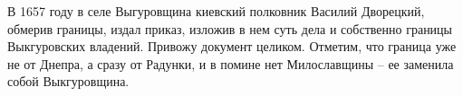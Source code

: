 
В 1657 году в селе Выгуровщина киевский полковник Василий Дворецкий, обмерив границы, издал приказ, изложив в нем суть дела и собственно границы Выкгуровских владений. Привожу документ целиком\cite{mihdocs}. Отметим, что граница уже не от Днепра, а сразу от Радунки, и в помине нет Милославщины – ее заменила собой Выкгуровщина.

